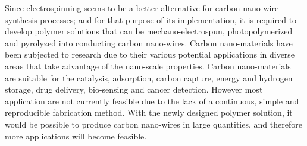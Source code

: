 Since electrospinning seems to be a better alternative for carbon nano-wire synthesis processes; and for that purpose of its implementation, it is required to develop polymer solutions that can be mechano-electrospun, photopolymerized and pyrolyzed into conducting carbon nano-wires. Carbon nano-materials have been subjected to research due to their various potential applications in diverse areas that take advantage of the nano-scale properties. \cite{Siddiqui2019} Carbon nano-materials are suitable for the catalysis, adsorption, carbon capture, energy and hydrogen storage, drug delivery, bio-sensing and cancer detection. \cite{Siddiqui2019} However most application are not currently feasible due to the lack of a continuous, simple and reproducible fabrication method. With the newly designed polymer solution, it would be possible to produce carbon nano-wires in large quantities, and therefore more applications will become feasible.






